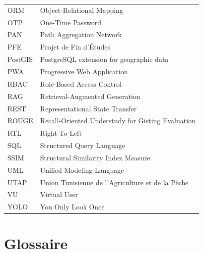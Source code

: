 \begin{longtable}{lp{10cm}}
ORM & Object-Relational Mapping \\
OTP & One-Time Password \\
PAN & Path Aggregation Network \\
PFE & Projet de Fin d'Études \\
PostGIS & PostgreSQL extension for geographic data \\
PWA & Progressive Web Application \\
RBAC & Role-Based Access Control \\
RAG & Retrieval-Augmented Generation \\
REST & Representational State Transfer \\
ROUGE & Recall-Oriented Understudy for Gisting Evaluation \\
RTL & Right-To-Left \\
SQL & Structured Query Language \\
SSIM & Structural Similarity Index Measure \\
UML & Unified Modeling Language \\
UTAP & Union Tunisienne de l'Agriculture et de la Pêche \\
VU & Virtual User \\
YOLO & You Only Look Once \\
\bottomrule
\end{longtable}

\chapter*{Glossaire}

